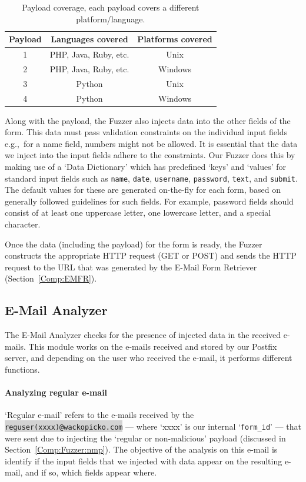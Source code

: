 \begin{table}[!htbp]
	\centering
	\begin{tabular}{|c|c|c|}
		\hline
		\multicolumn{1}{|c|}{\textbf{Payload}} & \multicolumn{1}{c}{\textbf{Languages covered}} & \multicolumn{1}{|c|}{\textbf{Platforms covered}}\\
		\hline
		1 & PHP, Java, Ruby, etc. & Unix\\
		\hline
		2 & PHP, Java, Ruby, etc. & Windows\\
		\hline
		3 & Python & Unix\\
		\hline
		4 & Python & Windows\\
		\hline
	\end{tabular}
	\caption[]{Payload coverage, each payload covers a different platform/language.}
	\label{tab:payloadcov}
\end{table}
Along with the payload, the Fuzzer also injects data into the other fields of the form. This data must pass validation constraints on the individual input fields e.g.,\ for a name field, numbers might not be allowed. It is essential that the data we inject into the input fields adhere to the constraints. Our Fuzzer does this by making use of a `Data Dictionary' which has predefined `keys' and `values' for standard input fields such as \texttt{name}, \texttt{date}, \texttt{username}, \texttt{password}, \texttt{text}, and \texttt{submit}. The default values for these are generated on-the-fly for each form, based on generally followed guidelines for such fields. For example, password fields should consist of at least one uppercase letter, one lowercase letter, and a special character.

Once the data (including the payload) for the form is ready, the Fuzzer constructs the appropriate HTTP request (GET or POST) and sends the HTTP request to the URL that was generated by the E-Mail Form Retriever (Section~\ref{Comp:EMFR}). 


\subsection{E-Mail Analyzer}
\label{Comp:EMA}
The E-Mail Analyzer checks for the presence of injected data in the received e-mails. This module works on the e-mails received and stored by our Postfix server, and depending on the user who received the e-mail, it performs different functions.
\paragraph{Analyzing regular e-mail}
`Regular e-mail' refers to the e-mails received by the \colorbox{lightgray}{\lstinline{reguser(xxxx)@wackopicko.com}} --- where `xxxx' is our internal `\lstinline{form_id}' --- that were sent due to injecting the `regular or non-malicious' payload (discussed in Section~\ref{Comp:Fuzzer:nmp}). The objective of the analysis on this e-mail is identify if the input fields that we injected with data appear on the resulting e-mail, and if so, which fields appear where.

